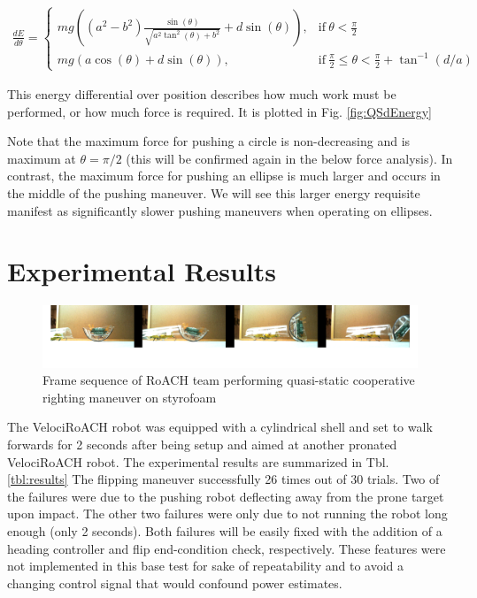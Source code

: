 \documentclass[letterpaper]{report}
\begin{document}
\begin{align}
  \frac{dE}{d\theta} =
  \begin{cases}
    mg ( (a^2 - b^2) \frac{\sin(\theta)}{\sqrt{a^2 \tan^2(\theta) + b^2}} + d \sin(\theta) ), & \text{if}\ \theta < \frac{\pi}{2} \\
    mg (a \cos(\theta) + d \sin(\theta) ), & \text{if}\ \frac{\pi}{2} \leq \theta < \frac{\pi}{2} + \tan^{-1}(d/a)
  \end{cases}
  \label{eq:QSdEnergy}
\end{align}

This energy differential over position describes how much work must be performed, or how much force is required.
It is plotted in Fig. \ref{fig:QSdEnergy}

Note that the maximum force for pushing a circle is non-decreasing and is maximum at $\theta = \pi/2$ (this will be confirmed again in the below force analysis).
In contrast, the maximum force for pushing an ellipse is much larger and occurs in the middle of the pushing maneuver.
We will see this larger energy requisite manifest as significantly slower pushing maneuvers when operating on ellipses.

\section{Experimental Results}
\begin{figure}[ht]
\centering
\includegraphics[width=1.0\textwidth]{QSFlipStrip3.png}
\caption{Frame sequence of RoACH team performing quasi-static cooperative righting maneuver on styrofoam}
\end{figure}

The VelociRoACH robot was equipped with a cylindrical shell and set to walk forwards for 2 seconds after being setup and aimed at another pronated VelociRoACH robot.
The experimental results are summarized in Tbl. \ref{tbl:results}
The flipping maneuver successfully 26 times out of 30 trials. Two of the failures were due to the pushing robot deflecting away from the prone target upon impact.
The other two failures were only due to not running the robot long enough (only 2 seconds).
Both failures will be easily fixed with the addition of a heading controller and flip end-condition check, respectively.
These features were not implemented in this base test for sake of repeatability and to avoid a changing control signal that would confound power estimates.
\end{document}
